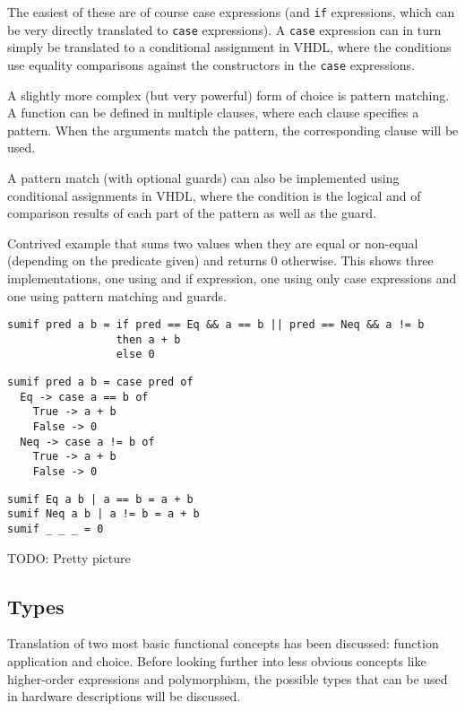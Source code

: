 \documentclass[conference]{IEEEtran}
\def\VHDL{\textsc{VHDL}}
\def\hs#1{\texttt{#1}}
\begin{document}
    The easiest of these are of course case expressions (and \hs{if}
    expressions, which can be very directly translated to \hs{case}
    expressions). A \hs{case} expression can in turn simply be
    translated to a conditional assignment in \VHDL, where the
    conditions use equality comparisons against the constructors in the
    \hs{case} expressions.

    A slightly more complex (but very powerful) form of choice is
    pattern matching. A function can be defined in multiple clauses,
    where each clause specifies a pattern. When the arguments match the
    pattern, the corresponding clause will be used.

    A pattern match (with optional guards) can also be implemented using
    conditional assignments in \VHDL, where the condition is the logical
    and of comparison results of each part of the pattern as well as the
    guard.

    Contrived example that sums two values when they are equal or
    non-equal (depending on the predicate given) and returns 0
    otherwise. This shows three implementations, one using and if
    expression, one using only case expressions and one using pattern
    matching and guards.

\begin{verbatim}
sumif pred a b = if pred == Eq && a == b || pred == Neq && a != b
                 then a + b
                 else 0
\end{verbatim}

\begin{verbatim}
sumif pred a b = case pred of
  Eq -> case a == b of
    True -> a + b
    False -> 0
  Neq -> case a != b of
    True -> a + b
    False -> 0
\end{verbatim}

\begin{verbatim}
sumif Eq a b | a == b = a + b
sumif Neq a b | a != b = a + b
sumif _ _ _ = 0
\end{verbatim}

  TODO: Pretty picture

  \subsection{Types}
    Translation of two most basic functional concepts has been
    discussed: function application and choice. Before looking further
    into less obvious concepts like higher-order expressions and
    polymorphism, the possible types that can be used in hardware
    descriptions will be discussed.
\end{document}
